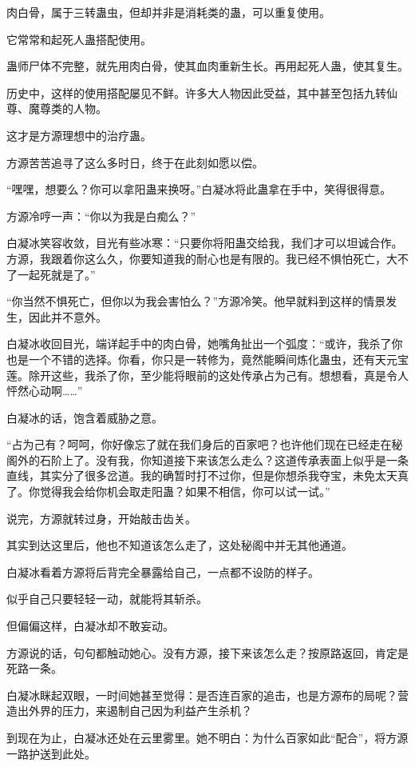 \begin{this_body}
肉白骨，属于三转蛊虫，但却并非是消耗类的蛊，可以重复使用。

它常常和起死人蛊搭配使用。

蛊师尸体不完整，就先用肉白骨，使其血肉重新生长。再用起死人蛊，使其复生。

历史中，这样的使用搭配屡见不鲜。许多大人物因此受益，其中甚至包括九转仙尊、魔尊类的人物。

这才是方源理想中的治疗蛊。

方源苦苦追寻了这么多时日，终于在此刻如愿以偿。

“嘿嘿，想要么？你可以拿阳蛊来换呀。”白凝冰将此蛊拿在手中，笑得很得意。

方源冷哼一声：“你以为我是白痴么？”

白凝冰笑容收敛，目光有些冰寒：“只要你将阳蛊交给我，我们才可以坦诚合作。方源，我跟着你这么久，你要知道我的耐心也是有限的。我已经不惧怕死亡，大不了一起死就是了。”

“你当然不惧死亡，但你以为我会害怕么？”方源冷笑。他早就料到这样的情景发生，因此并不意外。

白凝冰收回目光，端详起手中的肉白骨，她嘴角扯出一个弧度：“或许，我杀了你也是一个不错的选择。你看，你只是一转修为，竟然能瞬间炼化蛊虫，还有天元宝莲。除开这些，我杀了你，至少能将眼前的这处传承占为己有。想想看，真是令人怦然心动啊……”

白凝冰的话，饱含着威胁之意。

“占为己有？呵呵，你好像忘了就在我们身后的百家吧？也许他们现在已经走在秘阁外的石阶上了。没有我，你知道接下来该怎么走么？这道传承表面上似乎是一条直线，其实分了很多岔道。我的确暂时打不过你，但是你想杀我夺宝，未免太天真了。你觉得我会给你机会取走阳蛊？如果不相信，你可以试一试。”

说完，方源就转过身，开始敲击齿关。

其实到达这里后，他也不知道该怎么走了，这处秘阁中并无其他通道。

白凝冰看着方源将后背完全暴露给自己，一点都不设防的样子。

似乎自己只要轻轻一动，就能将其斩杀。

但偏偏这样，白凝冰却不敢妄动。

方源说的话，句句都触动她心。没有方源，接下来该怎么走？按原路返回，肯定是死路一条。

白凝冰眯起双眼，一时间她甚至觉得：是否连百家的追击，也是方源布的局呢？营造出外界的压力，来遏制自己因为利益产生杀机？

到现在为止，白凝冰还处在云里雾里。她不明白：为什么百家如此“配合”，将方源一路护送到此处。


\end{this_body}
